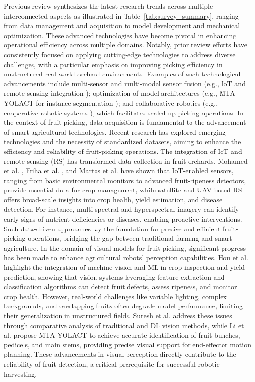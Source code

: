 \documentclass[a4paper,fleqn]{cas-dc}
\begin{document}
\iffalse
Previous review synthesizes the latest research trends across multiple interconnected aspects as illustrated in Table~\ref{tab:survey_summary}, ranging from data management and acquisition to model development and mechanical optimization. These advanced technologies have become pivotal in enhancing operational efficiency across multiple domains. Notably, prior review efforts have consistently focused on applying cutting-edge technologies to address diverse challenges, with a particular emphasis on improving picking efficiency in unstructured real-world orchard environments. Examples of such technological advancements include multi-sensor and multi-modal sensor fusion (e.g., IoT and remote sensing integration \cite{mohamed2021smart,friha2021internet,martos2021ensuring}); optimization of model architectures (e.g., MTA-YOLACT for instance segmentation \cite{li2023mta}); and collaborative robotics (e.g., cooperative robotic systems \cite{lytridis2021overview,li2023multi}), which facilitates scaled-up picking operations.
In the context of fruit picking, data acquisition is fundamental to the advancement of smart agricultural technologies. Recent research has explored emerging technologies and the necessity of standardized datasets, aiming to enhance the efficiency and reliability of fruit-picking operations. The integration of IoT and remote sensing (RS) has transformed data collection in fruit orchards. Mohamed et al. \cite{mohamed2021smart}, Friha et al. \cite{friha2021internet}, and Martos et al. \cite{martos2021ensuring} have shown that IoT-enabled sensors, ranging from basic environmental monitors to advanced fruit-ripeness detectors, provide essential data for crop management, while satellite and UAV-based RS offers broad-scale insights into crop health, yield estimation, and disease detection. For instance, multi-spectral and hyperspectral imagery can identify early signs of nutrient deficiencies or diseases, enabling proactive interventions. Such data-driven approaches lay the foundation for precise and efficient fruit-picking operations, bridging the gap between traditional farming and smart agriculture.
In the domain of visual models for fruit picking, significant progress has been made to enhance agricultural robots’ perception capabilities. Hou et al. \cite{hou2023overview} highlight the integration of machine vision and ML in crop inspection and yield prediction, showing that vision systems leveraging feature extraction and classification algorithms can detect fruit defects, assess ripeness, and monitor crop health. However, real-world challenges like variable lighting, complex backgrounds, and overlapping fruits often degrade model performance, limiting their generalization in unstructured fields. Suresh et al. \cite{suresh2023selective} address these issues through comparative analysis of traditional and DL vision methods, while Li et al. \cite{li2023mta} propose MTA-YOLACT to achieve accurate identification of fruit bunches, pedicels, and main stems, providing precise visual support for end-effector motion planning. These advancements in visual perception directly contribute to the reliability of fruit detection, a critical prerequisite for successful robotic harvesting.
\end{document}
